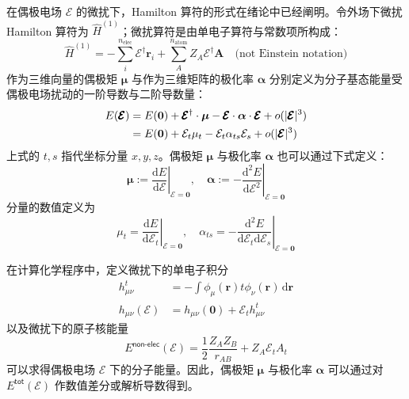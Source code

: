 在偶极电场 $\pmb{\mathcal{E}}$ 的微扰下，Hamilton 算符的形式\alert{在绪论中}已经阐明。令外场下微扰 Hamilton 算符为 $\hat H^{(1)}$；微扰算符是由单电子算符与常数项所构成：
\begin{equation}
  \label{eq.electric-perturbed-hamiltonian}
  \hat H^{(1)} = - \sum_i^{n_\mathrm{elec}} \pmb{\mathcal{E}}^\dagger \bm{r}_i + \sum_{A}^{n_\mathrm{atom}} Z_A \pmb{\mathcal{E}}^\dagger \bm{A} \quad \text{(not Einstein notation)}
\end{equation}
作为三维向量的偶极矩 $\bm{\mu}$ 与作为三维矩阵的极化率 $\bm{\alpha}$ 分别定义为分子基态能量受偶极电场扰动的一阶导数与二阶导数量\cite{Atkins-Friedman.Oxford.2011}：
\begin{align}
  E(\pmb{\mathcal{E}}) &= E(\bm{0}) + \pmb{\mathcal{E}}^\dagger \cdot \bm{\mu} - \pmb{\mathcal{E}} \cdot \bm{\alpha} \cdot \pmb{\mathcal{E}} + o(|\pmb{\mathcal{E}}|^3) \notag\\
  &= E(\bm{0}) + \mathcal{E}_t \mu_t - \mathcal{E}_t \alpha_{ts} \mathcal{E}_s + o(|\pmb{\mathcal{E}}|^3)
\end{align}
上式的 $t, s$ 指代坐标分量 $x, y, z$。偶极矩 $\bm{\mu}$ 与极化率 $\bm{\alpha}$ 也可以通过下式定义：
\begin{equation}
  \bm{\mu} := \left. \frac{\mathrm{d} E}{\mathrm{d} \pmb{\mathcal{E}}} \right|_{\pmb{\mathcal{E}} = \bm{0}}, \quad
  \bm{\alpha} := - \left. \frac{\mathrm{d}^2 E}{\mathrm{d} \pmb{\mathcal{E}}^2} \right|_{\pmb{\mathcal{E}} = \bm{0}}
\end{equation}
分量的数值定义为
\begin{equation}
  \mu_t = \left. \frac{\mathrm{d} E}{\mathrm{d} \mathcal{E}_t} \right|_{\pmb{\mathcal{E}} = \bm{0}}, \quad
  \alpha_{ts} = - \left. \frac{\mathrm{d}^2 E}{\mathrm{d} \mathcal{E}_t \mathrm{d} \mathcal{E}_s} \right|_{\pmb{\mathcal{E}} = \bm{0}}
\end{equation}

在计算化学程序中，定义微扰下的单电子积分
\begin{align}
  h_{\mu \nu}^{t} &= - \int \phi_\mu (\bm{r}) t \phi_\nu (\bm{r}) \, \mathrm{d} \bm{r} \\
  \label{eq.def.huv-with-perturb}
  h_{\mu \nu} (\pmb{\mathcal{E}}) &= h_{\mu \nu} (\bm{0}) + \mathcal{E}_t h_{\mu \nu}^t
\end{align}
以及微扰下的原子核能量
\begin{equation}
  E^\textsf{non-elec} (\pmb{\mathcal{E}}) = \frac{1}{2} \frac{Z_A Z_B}{r_{AB}} + Z_A \mathcal{E}_t A_t
\end{equation}
可以求得偶极电场 $\pmb{\mathcal{E}}$ 下的分子能量。因此，偶极矩 $\bm{\mu}$ 与极化率 $\bm{\alpha}$ 可以通过对 $E^\textsf{tot} (\pmb{\mathcal{E}})$ 作数值差分或解析导数得到。

